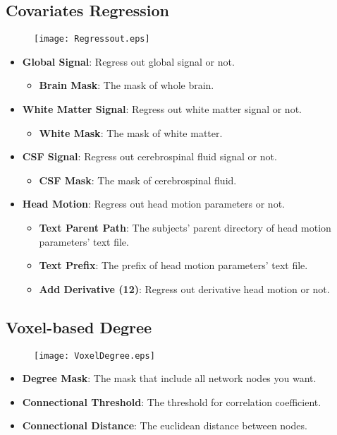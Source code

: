 \documentclass[11pt]{article}
\begin{document}
		\subsection{Covariates Regression}
			\begin{figure}
				\begin{center}
					\texttt{[image: Regressout.eps]}
				\end{center}
			\end{figure}
			\begin{itemize}
				\item \textbf{Global Signal}: Regress out global signal or not.
					\begin{itemize}
						\item \textbf{Brain Mask}: The mask of whole brain.
					\end{itemize}
				\item \textbf{White Matter Signal}: Regress out white matter signal or not.
					\begin{itemize}
						\item \textbf{White Mask}: The mask of white matter.
					\end{itemize}
				\item \textbf{CSF Signal}: Regress out cerebrospinal fluid signal or not.
					\begin{itemize}
						\item \textbf{CSF Mask}: The mask of cerebrospinal fluid.
					\end{itemize}
				\item \textbf{Head Motion}: Regress out head motion parameters or not.
					\begin{itemize}
						\item \textbf{Text Parent Path}: The subjects' parent directory of head motion parameters' text file.
						\item \textbf{Text Prefix}: The prefix of head motion parameters' text file.
						\item \textbf{Add Derivative (12)}: Regress out derivative head motion or not.
					\end{itemize}
			\end{itemize}
		\subsection{Voxel-based Degree}
			\begin{figure}
				\begin{center}
					\texttt{[image: VoxelDegree.eps]}
				\end{center}
			\end{figure}
			\begin{itemize}
				\item \textbf{Degree Mask}: The mask that include all network nodes you want.
				\item \textbf{Connectional Threshold}: The threshold for correlation coefficient.
				\item \textbf{Connectional Distance}: The euclidean distance between nodes.
			\end{itemize}
\end{document}
